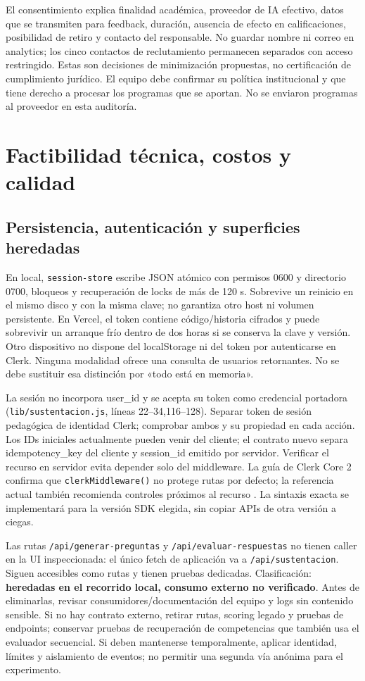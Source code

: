 \documentclass[11pt,a4paper]{report}
\newcommand{\src}[2]{\nolinkurl{#1}, líneas #2}
\begin{document}
El consentimiento explica finalidad académica, proveedor de IA efectivo, datos que se transmiten para feedback, duración, ausencia de efecto en calificaciones, posibilidad de retiro y contacto del responsable. No guardar nombre ni correo en analytics; los cinco contactos de reclutamiento permanecen separados con acceso restringido. Estas son decisiones de minimización propuestas, no certificación de cumplimiento jurídico. El equipo debe confirmar su política institucional y que tiene derecho a procesar los programas que se aportan. No se enviaron programas al proveedor en esta auditoría.

\chapter{Factibilidad técnica, costos y calidad}
\label{ch:tecnica}
\section{Persistencia, autenticación y superficies heredadas}
En local, \texttt{session-store} escribe JSON atómico con permisos 0600 y directorio 0700, bloqueos y recuperación de locks de más de 120 s. Sobrevive un reinicio en el mismo disco y con la misma clave; no garantiza otro host ni volumen persistente. En Vercel, el token contiene código/historia cifrados y puede sobrevivir un arranque frío dentro de dos horas si se conserva la clave y versión. Otro dispositivo no dispone del localStorage ni del token por autenticarse en Clerk. Ninguna modalidad ofrece una consulta de usuarios retornantes. No se debe sustituir esa distinción por «todo está en memoria».

La sesión no incorpora user\_id y se acepta su token como credencial portadora (\src{lib/sustentacion.js}{22--34,116--128}). Separar token de sesión pedagógica de identidad Clerk; comprobar ambos y su propiedad en cada acción. Los IDs iniciales actualmente pueden venir del cliente; el contrato nuevo separa idempotency\_key del cliente y session\_id emitido por servidor. Verificar el recurso en servidor evita depender solo del middleware. La guía de Clerk Core 2 confirma que \texttt{clerkMiddleware()} no protege rutas por defecto; la referencia actual también recomienda controles próximos al recurso \cite{clerk5,clerkresource}. La sintaxis exacta se implementará para la versión SDK elegida, sin copiar APIs de otra versión a ciegas.

Las rutas \texttt{/api/generar-preguntas} y \texttt{/api/evaluar-respuestas} no tienen caller en la UI inspeccionada: el único fetch de aplicación va a \texttt{/api/sustentacion}. Siguen accesibles como rutas y tienen pruebas dedicadas. Clasificación: \textbf{heredadas en el recorrido local, consumo externo no verificado}. Antes de eliminarlas, revisar consumidores/documentación del equipo y logs sin contenido sensible. Si no hay contrato externo, retirar rutas, scoring legado y pruebas de endpoints; conservar pruebas de recuperación de competencias que también usa el evaluador secuencial. Si deben mantenerse temporalmente, aplicar identidad, límites y aislamiento de eventos; no permitir una segunda vía anónima para el experimento.
\end{document}

